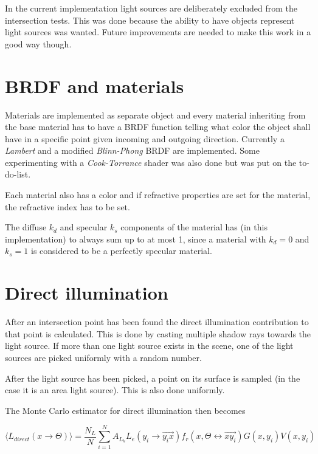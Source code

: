 \documentclass[a4paper]{report}
\begin{document}
In the current implementation light sources are deliberately excluded
from the intersection tests. This was done because the ability to have
objects represent light sources was wanted. Future improvements are
needed to make this work in a good way though.

\section{BRDF and materials}

Materials are implemented as separate object and every material
inheriting from the base material has to have a BRDF function telling
what color the object shall have in a specific point given incoming
and outgoing direction. Currently a \emph{Lambert} and a modified \emph{Blinn-Phong}
BRDF are implemented. Some experimenting with a \emph{Cook-Torrance} shader
was also done but was put on the to-do-list.

Each material also has a color and if refractive properties are set
for the material, the refractive index has to be set.

The diffuse \(k_d\) and specular \(k_s\) components of the material
has (in this implementation) to always sum up to at most 1, since a
material with \(k_d = 0\) and \(k_s = 1\) is considered to be a
perfectly specular material. 

\section{Direct illumination}

After an intersection point has been found the direct illumination
contribution to that point is calculated. This is done by casting
multiple shadow rays towards the light source. If more than one light
source exists in the scene, one of the light sources are picked
uniformly with a random number. 

After the light source has been picked, a point on its surface is
sampled (in the case it is an area light source). This is also done uniformly.

\pagebreak

The Monte Carlo estimator for direct illumination then becomes

\begin{equation}
  \langle L_{direct}(x \to \Theta) \rangle = \frac{N_L}{N}\sum^N_{i=1}
  A_{L_k}L_e(y_i \to \vec{y_ix})f_r(x,\Theta \leftrightarrow
  \vec{xy_i})G(x,y_i)V(x,y_i)
  \label{eq:direst}
\end{equation}
\end{document}
